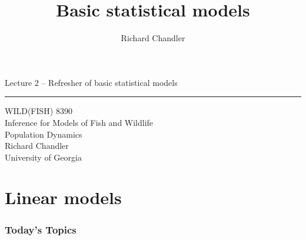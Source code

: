 \documentclass[color=usenames,dvipsnames]{beamer}\usepackage[]{graphicx}\usepackage[]{xcolor}
\title{Basic statistical models}
\author{Richard Chandler}
\begin{document}



\begin{frame}[plain]
  \LARGE
  \centering
  {\huge Lecture 2 -- Refresher of basic statistical models} \\
  {\color{default} \rule{\textwidth}{0.1pt}}
  \vfill
  \large
  WILD(FISH) 8390 \\
  Inference for Models of Fish and Wildlife \\ Population Dynamics \\
  \vfill
  \large
  Richard Chandler \\
  University of Georgia \\
\end{frame}




\section{Linear models}


\begin{frame}[plain]
  \frametitle{Today's Topics}
  \Large
\end{frame}
\end{document}
